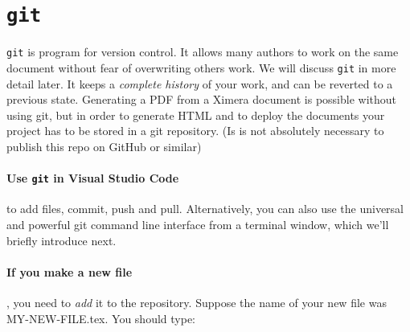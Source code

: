 \documentclass{ximera}
\begin{document}

\section{\texttt{git}}
\texttt{git} is program for version control. It allows many authors
to work on the same document without fear
of overwriting others work. We will discuss \texttt{git} in more detail later.
It keeps a \textit{complete history} of your work, and can be reverted to a
previous state. 
Generating a PDF from a Ximera document is possible without using git, but in order to
generate HTML and to deploy the documents your project has to be stored in a git repository.
(Is is not absolutely necessary to publish this repo on GitHub or similar)

\paragraph{Use \texttt{git} in Visual Studio Code} to add files, commit, push and pull.
Alternatively, you can also use the universal and powerful git command line interface from a 
terminal window, which we'll briefly introduce next.

\paragraph{If you make a new file}, you need to \textit{add} it to the
repository. Suppose the name of your new file was MY-NEW-FILE.tex. You should
type:
\end{document}
